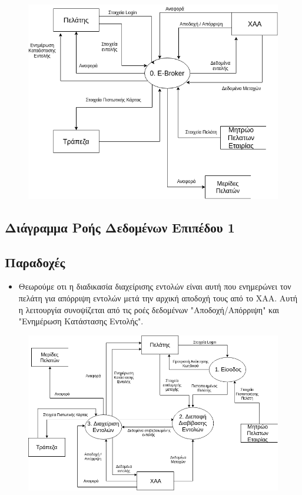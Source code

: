 \documentclass{article}
\begin{document}
		\begin{figure}[!h]
			\includegraphics[width=\linewidth]{../Structured_Analysis/General_Diagram.png}
		\end{figure}
	
	\newpage
	\subsection{Διάγραμμα Ροής Δεδομένων Επιπέδου 1}
	\subsection*{Παραδοχές}
	\begin{itemize}
		\item Θεωρούμε οτι η διαδικασία διαχείρισης εντολών είναι αυτή που ενημερώνει τον πελάτη για απόρριψη εντολών μετά την αρχική αποδοχή τους από το ΧΑΑ.
		Αυτή η λειτουργία συνοψίζεται από τις ροές δεδομένων "Αποδοχή/Απόρριψη" και "Ενημέρωση Κατάστασης Εντολής".
	\end{itemize}

	\begin{figure}[!h]
		\includegraphics[width=\linewidth]{../Structured_Analysis/Level_1_Diagram.png}
	\end{figure}
\end{document}

